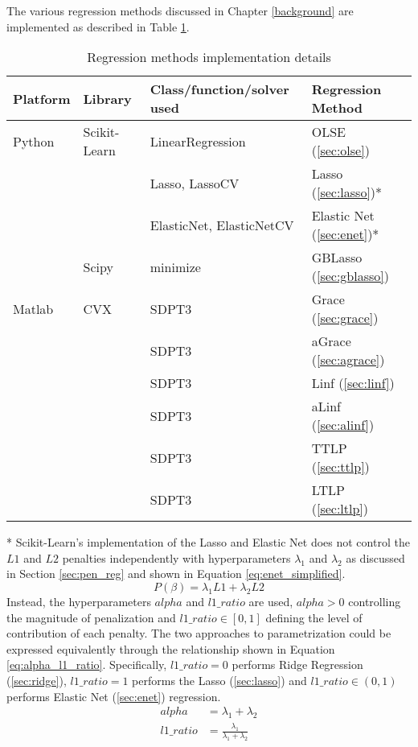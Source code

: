 The various regression methods discussed in Chapter \ref{background} are implemented as described in Table \ref{tab:method_impl}.
{\def\arraystretch{1.5}\tabcolsep=10pt
\begin{table}[ht]
	\label{tab:method_impl}
	\caption{Regression methods implementation details}
	\centering
	\begin{tabular}{l l l l}
		\hline\hline 
		Platform & Library & Class/function/solver used & Regression Method \\
		\hline
		Python 	& 	Scikit-Learn	&	LinearRegression			&	OLSE (\ref{sec:olse})			\\
				&					&	Lasso, LassoCV 				&	Lasso (\ref{sec:lasso})*		\\
				&					&	ElasticNet, ElasticNetCV	&	Elastic Net (\ref{sec:enet})*	\\
				&	Scipy			&	minimize					&	GBLasso (\ref{sec:gblasso})		\\
		Matlab	&	CVX				&	SDPT3						&	Grace (\ref{sec:grace})			\\
				&					&	SDPT3						&	aGrace (\ref{sec:agrace})		\\
				&					&	SDPT3						&	Linf (\ref{sec:linf})			\\
				&					&	SDPT3						&	aLinf (\ref{sec:alinf})			\\
				&					&	SDPT3						&	TTLP (\ref{sec:ttlp})			\\
				&					&	SDPT3						&	LTLP (\ref{sec:ltlp})			\\
		\hline
	\end{tabular}
\end{table}

}

* Scikit-Learn's implementation of the Lasso and Elastic Net does not control the $L1$ and $L2$ penalties independently with hyperparameters $\lambda_1$ and $\lambda_2$ as discussed in Section \ref{sec:pen_reg} and shown in Equation \ref{eq:enet_simplified}.
\begin{equation} \label{eq:enet_simplified}
P(\beta) = \lambda_1L1 + \lambda_2L2
\end{equation} 
Instead, the hyperparameters $alpha$ and $l1\_ratio$ are used, $alpha>0$ controlling the magnitude of penalization and $l1\_ratio \in [0,1]$ defining the level of contribution of each penalty. The two approaches to parametrization could be expressed equivalently through the relationship shown in Equation \ref{eq:alpha_l1_ratio}. Specifically, $l1\_ratio=0$ performs Ridge Regression (\ref{sec:ridge}), $l1\_ratio=1$ performs the Lasso (\ref{sec:lasso})  and $l1\_ratio \in (0,1)$ performs Elastic Net (\ref{sec:enet}) regression.
\begin{equation} \label{eq:alpha_l1_ratio}
\begin{aligned} 
alpha		&=	\lambda_1+\lambda_2 \\
l1\_ratio	&=	\frac{\lambda_1}{\lambda_1+\lambda_2}
\end{aligned}
\end{equation}